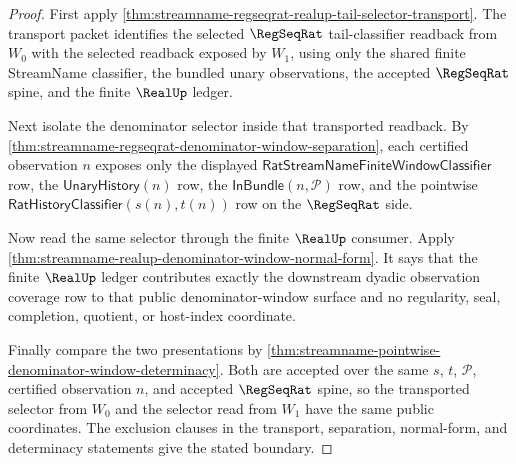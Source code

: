 \begin{proof}
First apply
\autoref{thm:streamname-regseqrat-realup-tail-selector-transport}. The
transport packet identifies the selected $\RegSeqRat$ tail-classifier readback
from $W_0$ with the selected readback exposed by $W_1$, using only the shared
finite StreamName classifier, the bundled unary observations, the accepted
$\RegSeqRat$ spine, and the finite $\RealUp$ ledger.

Next isolate the denominator selector inside that transported readback. By
\autoref{thm:streamname-regseqrat-denominator-window-separation}, each certified
observation $n$ exposes only the displayed
$\mathsf{RatStreamNameFiniteWindowClassifier}$ row, the
$\mathsf{UnaryHistory}(n)$ row, the $\mathsf{InBundle}(n,\mathcal P)$ row, and
the pointwise $\mathsf{RatHistoryClassifier}(s(n),t(n))$ row on the
$\RegSeqRat$ side.

Now read the same selector through the finite $\RealUp$ consumer. Apply
\autoref{thm:streamname-realup-denominator-window-normal-form}. It says that
the finite $\RealUp$ ledger contributes exactly the downstream dyadic
observation coverage row to that public denominator-window surface and no
regularity, seal, completion, quotient, or host-index coordinate.

Finally compare the two presentations by
\autoref{thm:streamname-pointwise-denominator-window-determinacy}. Both are
accepted over the same $s$, $t$, $\mathcal P$, certified observation $n$, and
accepted $\RegSeqRat$ spine, so the transported selector from $W_0$ and the
selector read from $W_1$ have the same public coordinates. The exclusion clauses
in the transport, separation, normal-form, and determinacy statements give the
stated boundary.
\end{proof}


